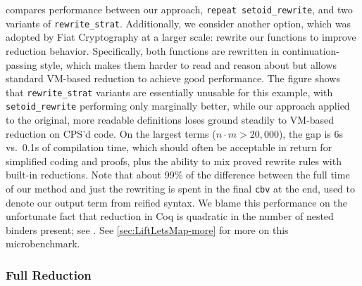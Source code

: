  compares performance between our approach, \texttt{repeat setoid\_rewrite}, and two variants of \texttt{rewrite\_strat}.
Additionally, we consider another option, which was adopted by Fiat Cryptography at a larger scale: rewrite our functions to improve reduction behavior.
Specifically, both functions are rewritten in continuation-passing style, which makes them harder to read and reason about but allows standard VM-based reduction to achieve good performance.
The figure shows that \texttt{rewrite\_strat} variants are essentially unusable for this example, with \texttt{setoid\_rewrite} performing only marginally better, while our approach applied to the original, more readable definitions loses ground steadily to VM-based reduction on CPS'd code.
On the largest terms ($n \cdot m > 20,000$), the gap is 6s vs.\ 0.1s of compilation time, which should often be acceptable in return for simplified coding and proofs, plus the ability to mix proved rewrite rules with built-in reductions.
Note that about 99\% of the difference between the full time of our method and just the rewriting is spent in the final \texttt{cbv} at the end, used to denote our output term from reified syntax.
We blame this performance on the unfortunate fact that reduction in Coq is quadratic in the number of nested binders present; see .
See \autoref{sec:LiftLetsMap-more} for more on this microbenchmark.

\subsubsection{Full Reduction}\label{sec:micro:Eratosthenes}

